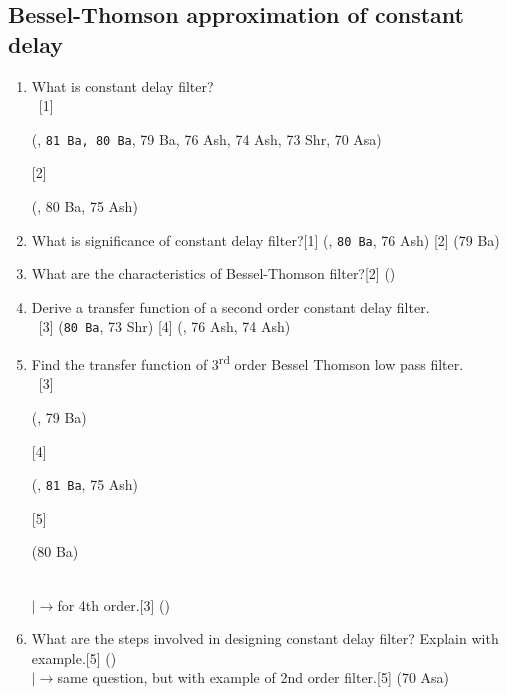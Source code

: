 \documentclass[12pt]{article}
\newcommand{\lb}{\\$\left|\rightarrow\right.$}
\newcommand{\enter}{\\\textcolor{white}{1}}
\begin{document}
\subsection{Bessel-Thomson approximation of constant delay}
\begin{enumerate}
\item What is constant delay filter?
\enter[1] \begin{footnotesize}(, \texttt{81 Ba, 80 Ba}, 79 Ba, 76 Ash, 74 Ash, 73 Shr, 70 Asa)\end{footnotesize} [2] \begin{footnotesize}(, 80 Ba, 75 Ash)\end{footnotesize}

\item What is significance of constant delay filter?\hfill[1] (, \texttt{80 Ba}, 76 Ash) [2] (79 Ba)

\item What are the characteristics of Bessel-Thomson filter?\hfill[2] ()

\item Derive a transfer function of a second order constant delay filter.
\enter\hfill[3] (\texttt{80 Ba}, 73 Shr) [4] (, 76 Ash, 74 Ash)

\item Find the transfer function of 3\textsuperscript{rd} order Bessel Thomson low pass filter.
\enter \hfill[3] \begin{footnotesize}(, 79 Ba)\end{footnotesize} [4] \begin{footnotesize}(, \texttt{81 Ba}, 75 Ash)\end{footnotesize} [5] \begin{footnotesize}(80 Ba)\end{footnotesize}
\lb for 4th order.\hfill[3] ()

\item What are the steps involved in designing constant delay filter? Explain with example.\hfill[5] ()
\lb same question, but with example of 2nd order filter.\hfill[5] (70 Asa)
\end{enumerate}
\end{document}
